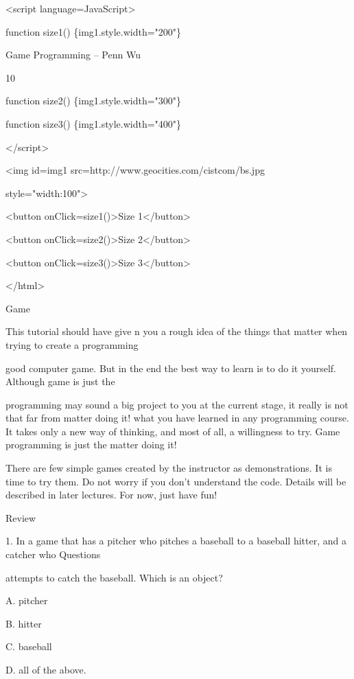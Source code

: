 \documentclass[
]{article}
\begin{document}
\textless script language=JavaScript\textgreater{}

function size1() \{img1.style.width="200"\}

Game Programming -- Penn Wu

10

\protect\hypertarget{index_split_001.htmlux5cux23p11}{}{}function
size2() \{img1.style.width="300"\}

function size3() \{img1.style.width="400"\}

\textless/script\textgreater{}

\textless img id=img1 src=http://www.geocities.com/cistcom/bs.jpg

style="width:100"\textgreater{}

\textless button onClick=size1()\textgreater Size
1\textless/button\textgreater{}

\textless button onClick=size2()\textgreater Size
2\textless/button\textgreater{}

\textless button onClick=size3()\textgreater Size
3\textless/button\textgreater{}

\textless/html\textgreater{}

Game

This tutorial should have give n you a rough idea of the things that
matter when trying to create a programming

good computer game. But in the end the best way to learn is to do it
yourself. Although game is just the

programming may sound a big project to you at the current stage, it
really is not that far from matter doing it! what you have learned in
any programming course. It takes only a new way of thinking, and most of
all, a willingness to try. Game programming is just the matter doing it!

There are few simple games created by the instructor as demonstrations.
It is time to try them. Do not worry if you don't understand the code.
Details will be described in later lectures. For now, just have fun!

Review

1. In a game that has a pitcher who pitches a baseball to a baseball
hitter, and a catcher who Questions

attempts to catch the baseball. Which is an object?

A. pitcher

B. hitter

C. baseball

D. all of the above.
\end{document}
